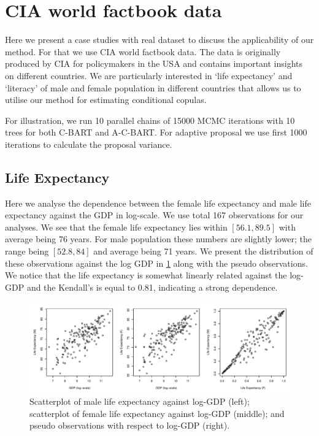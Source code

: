 \documentclass{amsart}
\begin{document}
\section{CIA world factbook data}\label{sec:cia}
Here we present a case studies with real dataset to discuss the applicability of our method. For that we use CIA world factbook data. The data is originally produced by CIA for policymakers in the USA and contains important insights on different countries. We are particularly interested in `life expectancy' and `literacy' of male and female population in different countries that allows us to utilise our method for estimating conditional copulas. 

For illustration, we run 10 parallel chains of 15000 MCMC iterations with 10 trees for both C-BART and A-C-BART. For adaptive proposal we use first 1000 iterations to calculate the proposal variance.

\subsection{Life Expectancy}
Here we analyse the dependence between the female life expectancy and male life expectancy against the GDP in log-scale. We use total 167 observations for our analyses. We see that the female life expectancy lies within $[56.1,89.5]$ with average being 76 years. For male population these numbers are slightly lower; the range being $[52.8, 84]$ and average being 71 years. We present the distribution of these observations against the log GDP in \cref{fig:data:dist:LE} along with the pseudo observations. We notice that the life expectancy is somewhat linearly related against the log-GDP and the Kendall's is equal to 0.81, indicating a strong dependence. 
\begin{figure}
	\centering
	\includegraphics[width = 0.95\linewidth]{"cia_LE_plots.pdf"}
	\caption{Scatterplot of male life expectancy against log-GDP (left); scatterplot of female life expectancy against log-GDP (middle); and pseudo observations with respect to log-GDP (right).}
	\label{fig:data:dist:LE}
\end{figure}
\end{document}

